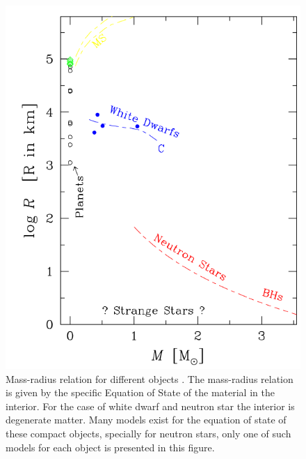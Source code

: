 \begin{figure}
                \centering
                \includegraphics[scale=0.3]{assets/images/mass-radius.png}
                \caption[Mass-radius relation for compact objects]{Mass-radius relation for different objects \citep{de2008stars}. The mass-radius relation is given by the specific Equation of State of the material in the interior. For the case of white dwarf and neutron star the interior is degenerate matter. Many models exist for the equation of state of these compact objects, specially for neutron stars, only one of such models for each object is presented in this figure.}
                \label{fig:massrad}
\end{figure}

